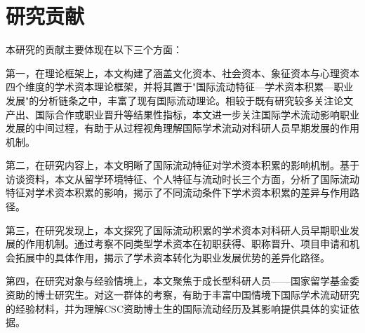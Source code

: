 \section{研究贡献}

本研究的贡献主要体现在以下三个方面：

第一，在理论框架上，本文构建了涵盖文化资本、社会资本、象征资本与心理资本四个维度的学术资本理论框架，并将其置于"国际流动特征---学术资本积累---职业发展"的分析链条之中，丰富了现有国际流动理论。相较于既有研究较多关注论文产出、国际合作或职业晋升等结果性指标，本文进一步关注国际学术流动影响职业发展的中间过程，有助于从过程视角理解国际学术流动对科研人员早期发展的作用机制。

第二，在研究内容上，本文明晰了国际流动特征对学术资本积累的影响机制。基于访谈资料，本文从留学环境特征、个人特征与流动时长三个方面，分析了国际流动特征对学术资本积累的影响，揭示了不同流动条件下学术资本积累的差异与作用路径。

第三，在研究发现上，本文探究了国际流动积累的学术资本对科研人员早期职业发展的作用机制。通过考察不同类型学术资本在初职获得、职称晋升、项目申请和机会拓展中的具体作用，揭示了学术资本转化为职业发展优势的差异化路径。

第四，在研究对象与经验情境上，本文聚焦于成长型科研人员——国家留学基金委资助的博士研究生。对这一群体的考察，有助于丰富中国情境下国际学术流动研究的经验材料，并为理解CSC资助博士生的国际流动经历及其影响提供具体的实证依据。
